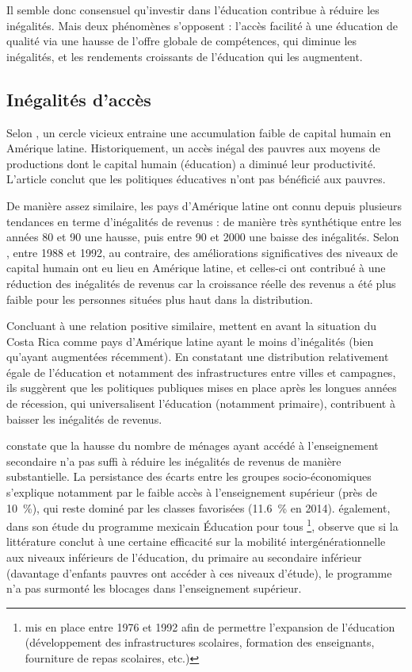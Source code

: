 \documentclass[pagesize, twoside=off, bibliography=totoc, DIV=calc, fontsize=12pt, a4paper, french]{scrartcl}
\begin{document}
Il semble donc consensuel qu’investir dans l’éducation contribue à réduire les inégalités. Mais deux phénomènes s’opposent : l’accès facilité à une éducation de qualité via une hausse de l’offre globale de compétences, qui diminue les inégalités, et les rendements croissants de l’éducation qui les augmentent.

\subsection{Inégalités d’accès}

Selon \citet{birdsall}, un cercle vicieux entraine une accumulation faible de capital humain en Amérique latine. Historiquement, un accès inégal des pauvres aux moyens de productions dont le capital humain (éducation) a diminué leur productivité. L’article conclut que les politiques éducatives n’ont pas bénéficié aux pauvres.

De manière assez similaire, les pays d’Amérique latine ont connu depuis plusieurs tendances en terme d'inégalités de revenus : de manière très synthétique entre les années 80 et 90 une hausse, puis entre 90 et 2000 une baisse des inégalités. Selon \citet{arabsheibani_2006}, entre 1988 et 1992, au contraire, des améliorations significatives des niveaux de capital humain ont eu lieu en Amérique latine, et celles-ci ont contribué à une réduction des inégalités de revenus car  la croissance réelle des revenus a été plus faible pour les personnes situées plus haut dans la distribution.

Concluant à une relation positive similaire, \citet{trejos_inequality_2004} mettent en avant la situation du Costa Rica comme pays d’Amérique latine ayant le moins d’inégalités (bien qu’ayant augmentées récemment). En constatant une distribution relativement égale de l’éducation et notamment des infrastructures entre villes et campagnes, ils suggèrent que les politiques publiques mises en place après les longues années de récession, qui universalisent l’éducation (notamment primaire), contribuent à baisser les inégalités de revenus. 

\citet{mejia_2024} constate que la hausse du nombre de ménages ayant accédé à l’enseignement secondaire n’a pas suffi à réduire les inégalités de revenus de manière substantielle. La persistance des écarts entre les groupes socio-économiques s’explique notamment par le faible accès à l’enseignement supérieur (près de \SI{10}{\percent}), qui reste dominé par les classes favorisées (\SI{11.6}{\percent} en 2014).  également, dans son étude du programme mexicain \og{}Éducation pour tous\fg{} \footnote{\label{ft_mex} mis en place entre 1976 et 1992 afin de permettre \og{}l’expansion de l’éducation\fg{} (développement des infrastructures scolaires, formation des enseignants, fourniture de repas scolaires, etc.)}, observe que si la littérature conclut à une certaine efficacité sur la mobilité intergénérationnelle aux niveaux inférieurs de l’éducation, du primaire au secondaire inférieur (davantage d’enfants pauvres ont accéder à ces niveaux d’étude), le programme n’a pas surmonté les blocages dans l’enseignement supérieur.
\end{document}
